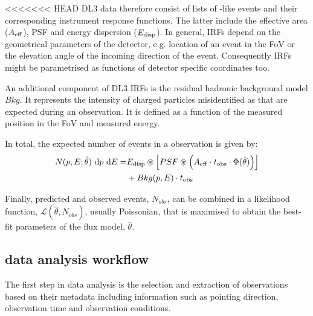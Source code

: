 \documentclass[longauth]{aa}
\begin{document}
<<<<<<< HEAD
DL3 \gammaray data therefore consist of lists of \gammaray-like events and their
corresponding instrument response functions. The latter include the effective area ($A_{\rm eff}$),
PSF and energy dispersion ($E_{\rm disp}$).
In general, IRFs depend on the geometrical parameters of the detector, e.g. location 
of an event in the FoV or the elevation angle of the incoming direction of the event.
Consequently IRFs might be parametrised as functions of detector specific coordinates too.


An additional component of DL3 IRFs is the residual hadronic background model $Bkg$.
It represents the intensity of charged particles misidentified as \gammarays that are expected
during an observation. It is defined as a function of the measured position in the FoV
and measured energy.

In total, the expected number of events in a \gammaray observation is given by:
\begin{equation}
	\begin{split}
  N(p, E; \hat{\theta})\ {\rm d}p\ {\rm d}E =  &E_{\rm disp} \circledast \left[ PSF \circledast \left( A_{\rm eff} \cdot t_{\rm obs} \cdot \Phi(\hat{\theta}) \right) \right]\\
                       & + Bkg(p, E) \cdot t_{\rm obs}
	\end{split}
\end{equation}
				

Finally, predicted and observed events, $N_{obs}$, can be combined in a likelihood function,
$\mathcal{L}(\hat{\theta}, N_{obs})$, usually Poissonian, that is maximised to obtain the best-fit parameters of the flux model, $\hat{\theta}$.

\subsection{\gammapy data analysis workflow}
The first step in \gammaray data analysis is the selection and extraction of observations
based on their metadata including information such as pointing direction, observation
time and observation conditions. 
\end{document}
